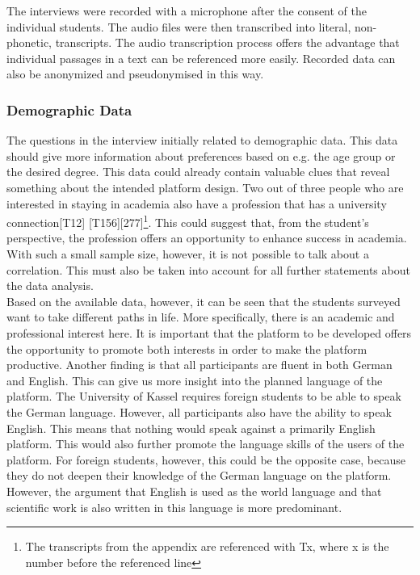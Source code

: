 The interviews were recorded with a microphone after the consent of the individual students.
The audio files were then transcribed into literal, non-phonetic, transcripts.
The audio transcription process offers the advantage that individual passages in a text can be referenced more easily.
Recorded data can also be anonymized and pseudonymised in this way.

\subsubsection{Demographic Data}
The questions in the interview initially related to demographic data.
This data should give more information about preferences based on e.g. the age group or the desired degree.
This data could already contain valuable clues that reveal something about the intended platform design.
Two out of three people who are interested in staying in academia also have a profession that has a university connection[T12] [T156][277]\footnote{The transcripts from the appendix are referenced with Tx, where x is the number before the referenced line}.
This could suggest that, from the student's perspective, the profession offers an opportunity to enhance success in academia.
With such a small sample size, however, it is not possible to talk about a correlation.
This must also be taken into account for all further statements about the data analysis.\\

Based on the available data, however, it can be seen that the students surveyed want to take different paths in life.
More specifically, there is an academic and professional interest here.
It is important that the platform to be developed offers the opportunity to promote both interests in order to make the platform productive.
Another finding is that all participants are fluent in both German and English.
This can give us more insight into the planned language of the platform.
The University of Kassel requires foreign students to be able to speak the German language.
However, all participants also have the ability to speak English.
This means that nothing would speak against a primarily English platform.
This would also further promote the language skills of the users of the platform.
For foreign students, however, this could be the opposite case, because they do not deepen their knowledge of the German language on the platform.
However, the argument that English is used as the world language and that scientific work is also written in this language is more predominant.\\

